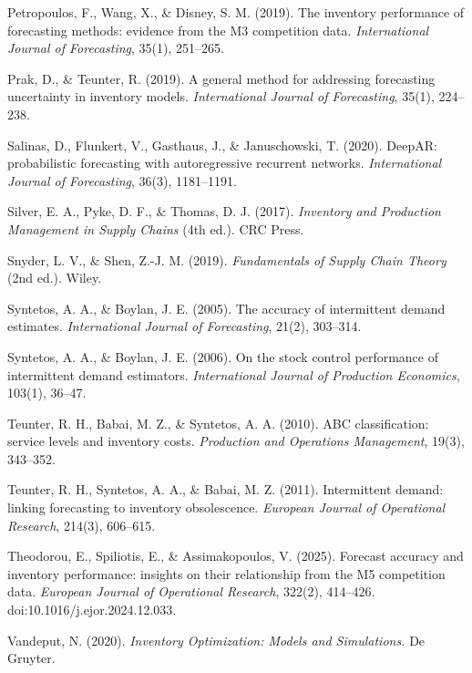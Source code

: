 \documentclass[11pt]{article}
\begin{document}
\begin{list}{}{%
  \setlength{\leftmargin}{1.5em}%
  \setlength{\itemindent}{-1.5em}%
  \setlength{\itemsep}{4pt}%
  \setlength{\parsep}{0pt}}
\item Petropoulos, F., Wang, X., \& Disney, S. M. (2019). The inventory
performance of forecasting methods: evidence from the M3 competition data.
\emph{International Journal of Forecasting}, 35(1), 251--265.

\item Prak, D., \& Teunter, R. (2019). A general method for addressing
forecasting uncertainty in inventory models. \emph{International Journal of
Forecasting}, 35(1), 224--238.

\item Salinas, D., Flunkert, V., Gasthaus, J., \& Januschowski, T. (2020).
DeepAR: probabilistic forecasting with autoregressive recurrent networks.
\emph{International Journal of Forecasting}, 36(3), 1181--1191.

\item Silver, E. A., Pyke, D. F., \& Thomas, D. J. (2017). \emph{Inventory and
Production Management in Supply Chains} (4th ed.). CRC Press.

\item Snyder, L. V., \& Shen, Z.-J. M. (2019). \emph{Fundamentals of Supply
Chain Theory} (2nd ed.). Wiley.

\item Syntetos, A. A., \& Boylan, J. E. (2005). The accuracy of intermittent
demand estimates. \emph{International Journal of Forecasting}, 21(2), 303--314.

\item Syntetos, A. A., \& Boylan, J. E. (2006). On the stock control
performance of intermittent demand estimators. \emph{International Journal of
Production Economics}, 103(1), 36--47.

\item Teunter, R. H., Babai, M. Z., \& Syntetos, A. A. (2010). ABC
classification: service levels and inventory costs. \emph{Production and
Operations Management}, 19(3), 343--352.

\item Teunter, R. H., Syntetos, A. A., \& Babai, M. Z. (2011). Intermittent
demand: linking forecasting to inventory obsolescence. \emph{European Journal
of Operational Research}, 214(3), 606--615.

\item Theodorou, E., Spiliotis, E., \& Assimakopoulos, V. (2025). Forecast
accuracy and inventory performance: insights on their relationship from the M5
competition data. \emph{European Journal of Operational Research}, 322(2),
414--426. doi:10.1016/j.ejor.2024.12.033.

\item Vandeput, N. (2020). \emph{Inventory Optimization: Models and
Simulations.} De Gruyter.

\end{list}
\end{document}
